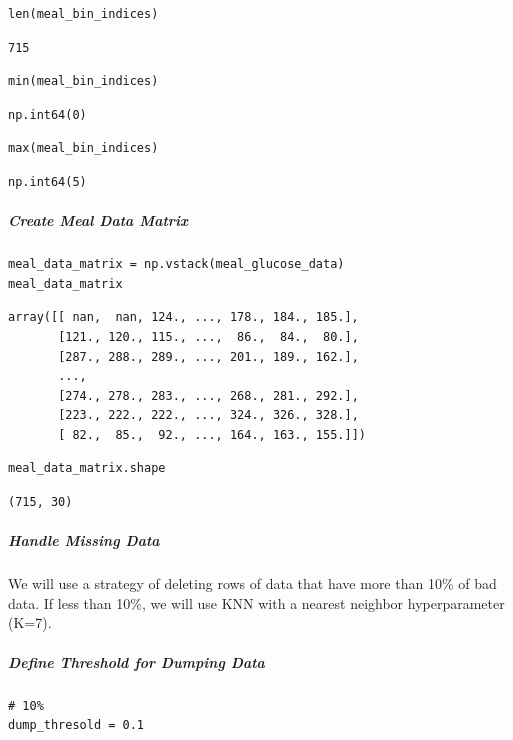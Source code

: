 \begin{verbatim}
len(meal_bin_indices)
\end{verbatim}

\begin{verbatim}
715
\end{verbatim}

\begin{verbatim}
min(meal_bin_indices)
\end{verbatim}

\begin{verbatim}
np.int64(0)
\end{verbatim}

\begin{verbatim}
max(meal_bin_indices)
\end{verbatim}

\begin{verbatim}
np.int64(5)
\end{verbatim}

\subparagraph{Create Meal Data Matrix}

\begin{verbatim}
meal_data_matrix = np.vstack(meal_glucose_data)
meal_data_matrix
\end{verbatim}

\begin{verbatim}
array([[ nan,  nan, 124., ..., 178., 184., 185.],
       [121., 120., 115., ...,  86.,  84.,  80.],
       [287., 288., 289., ..., 201., 189., 162.],
       ...,
       [274., 278., 283., ..., 268., 281., 292.],
       [223., 222., 222., ..., 324., 326., 328.],
       [ 82.,  85.,  92., ..., 164., 163., 155.]])
\end{verbatim}

\begin{verbatim}
meal_data_matrix.shape
\end{verbatim}

\begin{verbatim}
(715, 30)
\end{verbatim}

\subparagraph{Handle Missing Data}

We will use a strategy of deleting rows of data that have more than 10\% of bad data.  If less than 10\%, we will use KNN with a nearest neighbor hyperparameter (K=7).

\subparagraph{Define Threshold for Dumping Data}

\begin{verbatim}
# 10%
dump_thresold = 0.1
\end{verbatim}

